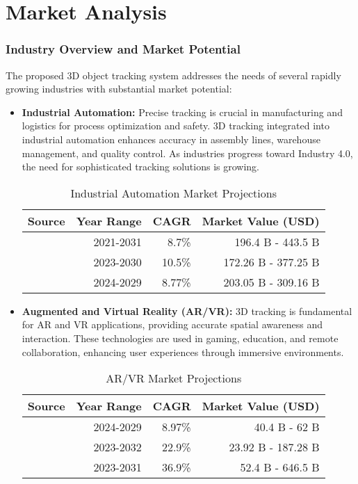 \chapter{Market Analysis}

\subsection{Industry Overview and Market Potential}

The proposed 3D object tracking system addresses the needs of several rapidly growing industries with substantial market potential:

\begin{itemize}
	\item \textbf{Industrial Automation:} Precise tracking is crucial in manufacturing and logistics for process optimization and safety. 3D tracking integrated into industrial automation enhances accuracy in assembly lines, warehouse management, and quality control. As industries progress toward Industry 4.0, the need for sophisticated tracking solutions is growing.
	
	\begin{table}[H]
		\centering
		\label{table:industrial_automation}
		\begin{tabular}{lrrr}
			\hline\hline
			\textbf{Source} & \textbf{Year Range} & \textbf{CAGR} & \textbf{Market Value (USD)} \\
			\hline
			\cite{alliedmarketresearch} & 2021-2031 & 8.7\% & 196.4 B - 443.5 B \\
			\cite{grandviewresearch} & 2023-2030 & 10.5\% & 172.26 B - 377.25 B \\
			\cite{mordorintelligence} & 2024-2029 & 8.77\% & 203.05 B - 309.16 B \\
			\hline
		\end{tabular}
		\caption{Industrial Automation Market Projections}
	\end{table}
	
	\item \textbf{Augmented and Virtual Reality (AR/VR):} 3D tracking is fundamental for AR and VR applications, providing accurate spatial awareness and interaction. These technologies are used in gaming, education, and remote collaboration, enhancing user experiences through immersive environments.
	
	\begin{table}[H]
		\centering
		\label{table:ar_vr}
		\begin{tabular}{lrrr}
			\hline\hline
			\textbf{Source} & \textbf{Year Range} & \textbf{CAGR} & \textbf{Market Value (USD)} \\
			\hline
			\cite{statista_ar_vr} & 2024-2029 & 8.97\% & 40.4 B - 62 B \\
			\cite{precedenceresearch} & 2023-2032 & 22.9\% & 23.92 B - 187.28 B \\
			\cite{theinsightpartners_ar_vr} & 2023-2031 & 36.9\% & 52.4 B - 646.5 B \\
			\hline
		\end{tabular}
		\caption{AR/VR Market Projections}
	\end{table}
	

\end{itemize}
